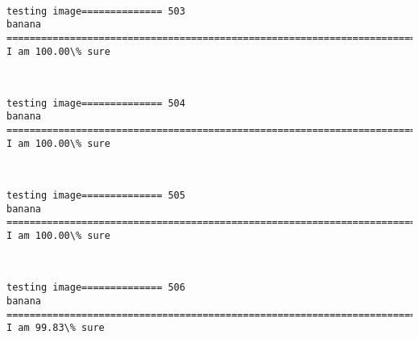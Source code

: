 \documentclass[11pt]{article}
\begin{document}
    \begin{center}
    \end{center}
    { \hspace*{\fill} \\}
    
    \begin{Verbatim}[commandchars=\\\{\}]
testing image============== 503
banana
============================================================================
I am 100.00\% sure

    \end{Verbatim}

    \begin{center}
    \end{center}
    { \hspace*{\fill} \\}
    
    \begin{Verbatim}[commandchars=\\\{\}]
testing image============== 504
banana
============================================================================
I am 100.00\% sure

    \end{Verbatim}

    \begin{center}
    \end{center}
    { \hspace*{\fill} \\}
    
    \begin{Verbatim}[commandchars=\\\{\}]
testing image============== 505
banana
============================================================================
I am 100.00\% sure

    \end{Verbatim}

    \begin{center}
    \end{center}
    { \hspace*{\fill} \\}
    
    \begin{Verbatim}[commandchars=\\\{\}]
testing image============== 506
banana
============================================================================
I am 99.83\% sure

    \end{Verbatim}
\end{document}
